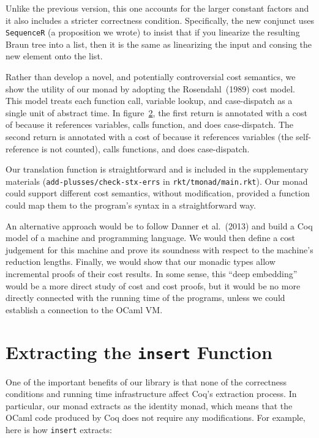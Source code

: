 \documentclass{llncs}
\newcommand{\sectionNewpage}{}
\newcommand{\Scribtexttt}[1]{{\texttt{#1}}}
\let\SOriginalthesubsection\thesubsection
\newcommand{\Ssection}[2]{\section[#1]{#2}\let\thesubsection\SOriginalthesubsection}
\newcommand{\FigureRef}[2]{\hyperref[#2]{#1}}
\begin{document}
\noindent Unlike the previous version, this one accounts for the larger constant
factors and it also includes a stricter correctness
condition. Specifically, the new conjunct uses \Scribtexttt{SequenceR} (a
proposition we wrote) to insist that if you linearize the resulting
Braun tree into a list, then it is the same as linearizing the input
and consing the new element onto the list.

Rather than develop a novel, and potentially controversial cost
semantics, we show the utility of our monad by adopting the
Rosendahl~(1989) cost model. This model treats
each function call, variable lookup, and case{-}dispatch as a single
unit of abstract time. In figure~\FigureRef{2}{t:x28counter_x28x22figurex22_x22figx3atranslationx22x29x29}, the first
return is annotated with a cost of  because it
references  variables, calls  function,
and does  case{-}dispatch. The second return is annotated
with a cost of  because it references 
variables (the self{-}reference is not counted), calls 
functions, and does  case{-}dispatch.

Our translation function is straightforward and is included in the
supplementary materials (\Scribtexttt{add{-}plusses/check{-}stx{-}errs} in
\Scribtexttt{rkt/tmonad/main{\hbox{\texttt{.}}}rkt}). Our monad could support different cost
semantics, without modification, provided a function could map them to
the program{'}s syntax in a straightforward way.

An alternative approach would be to follow
Danner et al.~(2013) and build a Coq model of a machine and
programming language. We would then define a cost judgement for this
machine and prove its soundness with respect to the machine{'}s
reduction lengths. Finally, we would show that our monadic types allow
incremental proofs of their cost results. In some sense, this {``}deep
embedding{''} would be a more direct study of cost and cost proofs, but
it would be no more directly connected with the running time of the programs,
unless we could establish a connection to the OCaml VM.

\sectionNewpage

\Ssection{Extracting the \Scribtexttt{insert} Function}{Extracting the \Scribtexttt{insert} Function}\label{t:x28part_x22secx3aextractx2dinsertx22x29}

One of the important benefits of our library is that
none of the correctness conditions and running time
infrastructure affect Coq{'}s extraction process.
In particular, our monad extracts as the identity
monad, which means that the OCaml code produced by Coq
does not require any modifications.
For example, here is how \Scribtexttt{insert} extracts:
\end{document}
